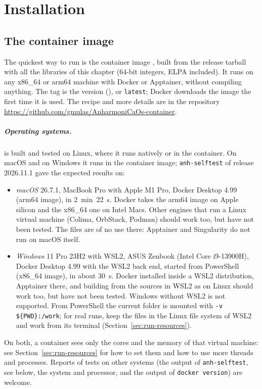 \chapter{Installation}\label{ch:install}

\section{The container image}\label{sec:container}

The quickest way to run \ac{} is the container image
, built from the release tarball with
all the libraries of this chapter (64-bit integers, ELPA included). It
runs on any x86\_64 or arm64 machine with Docker or Apptainer, without
compiling anything. The tag is the version (\texttt{\acversion}), or
\texttt{latest}; Docker downloads the image the first time it is used.
The recipe and more details are in the repository
\url{https://github.com/gmulas/AnharmoniCaOs-container}.

\paragraph{Operating systems.} \ac{} is built and tested on Linux, where
it runs natively or in the container. On macOS and on Windows it runs in
the container image; \texttt{anh-selftest} of release 2026.11.1 gave the
expected results on:
\begin{itemize}
\item \emph{macOS} 26.7.1, MacBook Pro with Apple M1 Pro, Docker
  Desktop 4.99 (arm64 image), in 2~min~22~s. Docker takes the arm64 image
  on Apple silicon and the x86\_64 one on Intel Macs. Other engines that
  run a Linux virtual machine (Colima, OrbStack, Podman) should work too,
  but have not been tested. The  files are of no use there:
  Apptainer and Singularity do not run on macOS itself.
\item \emph{Windows} 11 Pro 23H2 with WSL2, ASUS Zenbook (Intel Core
  i9-13900H), Docker Desktop
  4.99 with the WSL2 back end, started from PowerShell (x86\_64 image), in
  about 30~s. Docker installed inside a WSL2 distribution, Apptainer
  there, and building from the sources in WSL2 as on Linux should work
  too, but have not been tested. Windows without WSL2 is not supported.
  From PowerShell the current folder is mounted with
  \texttt{-v \$\{PWD\}:/work}; for real runs, keep the files in the
  Linux file system of WSL2 and work from its terminal
  (Section~\ref{sec:run-resources}).
\end{itemize}
On both, a container sees only the cores and the memory of that virtual
machine: see Section~\ref{sec:run-resources} for how to set them and how
to use more threads and processes.
Reports of tests on other systems (the output of
\texttt{anh-selftest}, see below, the system and processor, and the
output of \texttt{docker version}) are welcome.

